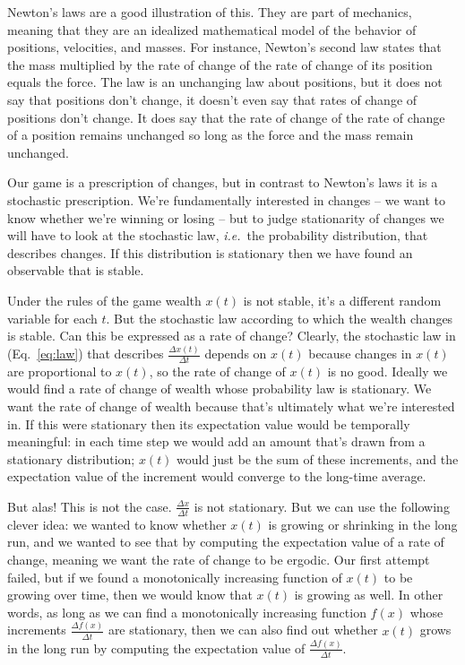\documentclass[a4paper]{article}
\newcommand{\ie}{{\it i.e.}\ }
\newcommand{\eref}[1]{(Eq.~\ref{eq:#1})}
\begin{document}
Newton's laws are a good illustration of this. They are part of mechanics, meaning that they
are an idealized mathematical model of the behavior of positions, velocities, and masses. 
For instance, Newton's second law states that the mass multiplied by the rate of 
change of the rate of change of its position equals the force. The law is an unchanging 
law about positions, but it does not say that positions don't change, it doesn't even say 
that rates of change of positions don't change. It does say that the rate of change of the 
rate of change of a position remains unchanged so long as the force and the mass 
remain unchanged.

Our game is a prescription of changes, but in contrast to Newton's laws it is a stochastic
prescription. We're fundamentally interested in changes -- we want to know 
whether we're winning or losing -- but to judge stationarity of changes we will have to look at
the stochastic law, \ie the probability distribution, that describes changes. If this distribution
is stationary then we have found an observable that is stable.

Under the rules of the game wealth $x(t)$ is not stable, it's a different 
random variable for each $t$. But the stochastic law according to which the wealth 
changes is stable. Can this be expressed as a rate of change? Clearly, 
the stochastic law in \eref{law} that describes $\frac{\Delta x(t)}{\Delta t}$ depends on $x(t)$ because
changes in $x(t)$ are proportional to $x(t)$, so the rate of change of $x(t)$ is no good. 
Ideally we would find a rate of change of wealth whose probability law is stationary. 
We want the rate of change of wealth because that's ultimately what we're interested in. 
If this were stationary then its expectation value would be temporally meaningful: 
in each time step we would add an amount that's drawn from a stationary distribution; 
$x(t)$ would just be the sum of these increments, and the expectation value of the 
increment would converge to the long-time average.

But alas! This is not the case. $\frac{\Delta x}{\Delta t}$ is not stationary. But we can use the following
clever idea: we wanted to know whether $x(t)$ is growing or shrinking in the long run, and we wanted
to see that by computing the expectation value of a rate of change, meaning we want the rate
of change to be ergodic. Our first attempt failed, but
if we found a monotonically increasing function of $x(t)$ to be growing over time, then 
we would know that $x(t)$ is growing as well. In other words, 
as long as we can find a monotonically increasing function $f(x)$ whose increments 
$\frac{\Delta f(x)}{\Delta t}$ are stationary, then we can also find out whether $x(t)$ grows
in the long run by computing the expectation value of $\frac{\Delta f(x)}{\Delta t}$.
\end{document}
